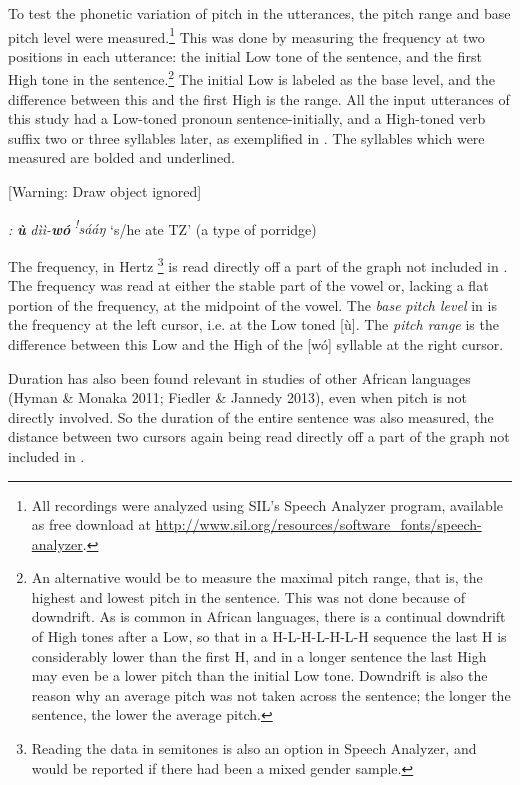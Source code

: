 \documentclass[output=paper]{langsci/langscibook}
\begin{document}
To test the phonetic variation of pitch in the utterances, the pitch range and base pitch level were measured.\footnote{ All recordings were analyzed using SIL’s Speech Analyzer program, available as free download at \url{http://www.sil.org/resources/software_fonts/speech-analyzer}.} This was done by measuring the frequency at two positions in each utterance: the initial Low tone of the sentence, and the first High tone in the sentence.\footnote{ An alternative would be to measure the maximal pitch range, that is, the highest and lowest pitch in the sentence. This was not done because of downdrift. As is common in African languages, there is a continual downdrift of High tones after a Low, so that in a H-L-H-L-H-L-H sequence the last H is considerably lower than the first H, and in a longer sentence the last High may even be a lower pitch than the initial Low tone. Downdrift is also the reason why an average pitch was not taken across the sentence; the longer the sentence, the lower the average pitch.} The initial Low is labeled as the base level, and the difference between this and the first High is the range. All the input utterances of this study had a Low-toned pronoun sentence-initially, and a High-toned verb suffix two or three syllables later, as exemplified in . The syllables which were measured are bolded and underlined.

[Warning: Draw object ignored]

  
 

\emph{\textup{:}}  \emph{\textbf{ù}}\emph{\textbf{ }}\emph{  dìì-}\emph{\textbf{wó}}\emph{  }\textit{\textsuperscript{!}}\emph{sááŋ}  ‘s/he ate TZ’    (a type of porridge)

The frequency, in Hertz \footnote{ Reading the data in semitones is also an option in Speech Analyzer, and would be reported if there had been a mixed gender sample.} is read directly off a part of the graph not included in . The frequency was read at either the stable part of the vowel or, lacking a flat portion of the frequency, at the midpoint of the vowel.  The \emph{base} \emph{pitch level} in  is the frequency at the left cursor, i.e. at the Low toned [ù]. The \emph{pitch range} is the difference between this Low and the High of the [wó] syllable at the right cursor. 

Duration has also been found relevant in studies of other African languages (Hyman \& Monaka 2011; Fiedler \& Jannedy 2013), even when pitch is not directly involved. So the duration of the entire sentence was also measured, the distance between two cursors again being read directly off a part of the graph not included in .
\end{document}
